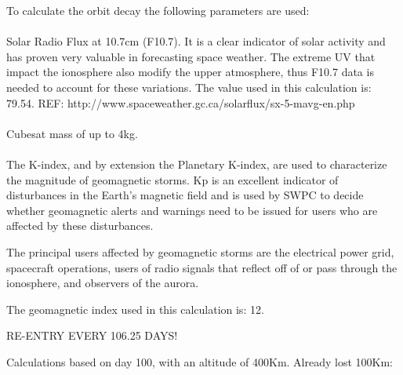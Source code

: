 To calculate the orbit decay the following parameters are used:
\paragraph{}Solar Radio Flux at 10.7cm (F10.7). It is a clear indicator of solar activity and has proven very valuable in forecasting space weather. The extreme UV that impact the ionosphere also modify the upper atmosphere, thus F10.7 data is needed to account for these variations. The value used in this calculation is: 79.54.
REF: http://www.spaceweather.gc.ca/solarflux/sx-5-mavg-en.php

\paragraph{}Cubesat mass of up to 4kg.

\paragraph{}The K-index, and by extension the Planetary K-index, are used to characterize the magnitude of geomagnetic storms. Kp is an excellent indicator of disturbances in the Earth's magnetic field and is used by SWPC to decide whether geomagnetic alerts and warnings need to be issued for users who are affected by these disturbances.

The principal users affected by geomagnetic storms are the electrical power grid, spacecraft operations, users of radio signals that reflect off of or pass through the ionosphere, and observers of the aurora.

The geomagnetic index used in this calculation is: 12.

RE-ENTRY EVERY 106.25 DAYS!

Calculations based on day 100, with an altitude of 400Km. Already lost 100Km:




